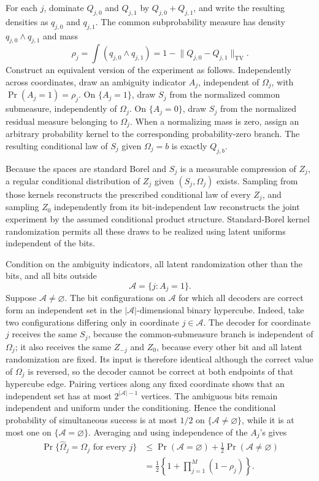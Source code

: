 For each \(j\), dominate \(Q_{j,0}\) and \(Q_{j,1}\) by \(Q_{j,0}+Q_{j,1}\), and write the resulting densities as \(q_{j,0}\) and \(q_{j,1}\).  The common subprobability measure has density \(q_{j,0}\wedge q_{j,1}\) and mass
\[
 \rho_j=\int(q_{j,0}\wedge q_{j,1})
 =1-\lVert Q_{j,0}-Q_{j,1}\rVert_{\mathrm{TV}}.
\]
Construct an equivalent version of the experiment as follows.  Independently across coordinates, draw an ambiguity indicator \(A_j\), independent of \(\Omega_j\), with \(\Pr(A_j=1)=\rho_j\).  On \(\{A_j=1\}\), draw \(S_j\) from the normalized common submeasure, independently of \(\Omega_j\).  On \(\{A_j=0\}\), draw \(S_j\) from the normalized residual measure belonging to \(\Omega_j\).  When a normalizing mass is zero, assign an arbitrary probability kernel to the corresponding probability-zero branch.  The resulting conditional law of \(S_j\) given \(\Omega_j=b\) is exactly \(Q_{j,b}\).

Because the spaces are standard Borel and \(S_j\) is a measurable compression of \(Z_j\), a regular conditional distribution of \(Z_j\) given \((S_j,\Omega_j)\) exists.  Sampling from those kernels reconstructs the prescribed conditional law of every \(Z_j\), and sampling \(Z_0\) independently from its bit-independent law reconstructs the joint experiment by the assumed conditional product structure.  Standard-Borel kernel randomization permits all these draws to be realized using latent uniforms independent of the bits.

Condition on the ambiguity indicators, all latent randomization other than the bits, and all bits outside
\[
 \mathcal A=\{j:A_j=1\}.
\]
Suppose \(\mathcal A\neq\varnothing\).  The bit configurations on \(\mathcal A\) for which all decoders are correct form an independent set in the \(|\mathcal A|\)-dimensional binary hypercube.  Indeed, take two configurations differing only in coordinate \(j\in\mathcal A\).  The decoder for coordinate \(j\) receives the same \(S_j\), because the common-submeasure branch is independent of \(\Omega_j\); it also receives the same \(Z_{-j}\) and \(Z_0\), because every other bit and all latent randomization are fixed.  Its input is therefore identical although the correct value of \(\Omega_j\) is reversed, so the decoder cannot be correct at both endpoints of that hypercube edge.  Pairing vertices along any fixed coordinate shows that an independent set has at most \(2^{|\mathcal A|-1}\) vertices.  The ambiguous bits remain independent and uniform under the conditioning.  Hence the conditional probability of simultaneous success is at most \(1/2\) on \(\{\mathcal A\neq\varnothing\}\), while it is at most one on \(\{\mathcal A=\varnothing\}\).  Averaging and using independence of the \(A_j\)'s gives
\[
\begin{aligned}
 \Pr\{\widehat\Omega_j=\Omega_j\text{ for every }j\}
 &\leq \Pr(\mathcal A=\varnothing)+\frac12\Pr(\mathcal A\neq\varnothing)\\
 &=\frac12\left\{1+\prod_{j=1}^M(1-\rho_j)\right\}.
\end{aligned}
\]

